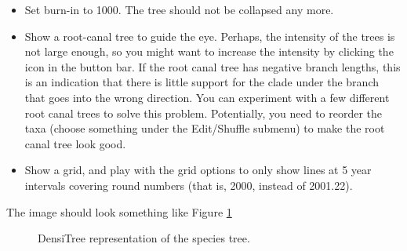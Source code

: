 \documentclass{article}
\begin{document}
\begin{itemize}
\item Set burn-in to 1000. The tree should not be collapsed any more.
\item Show a root-canal tree to guide the eye. Perhaps, the intensity of the trees is not large enough, so you might want to increase the intensity by clicking the icon in the button bar. If the root canal tree has negative branch lengths, this is an indication that there is little support for the clade under the branch that goes into the wrong direction. You can experiment with a few different root canal trees to solve this problem. Potentially, you need to reorder the taxa (choose something under the Edit/Shuffle submenu) to make the root canal tree look good.
\item Show a grid, and play with the grid options to only show lines at 5 year intervals covering round numbers (that is, 2000, instead of 2001.22).
\end{itemize}

The image should look something like Figure \ref{fig.DensiTree}

\begin{figure}
\begin{center}


\end{center}
\caption{\label{fig.DensiTree} DensiTree representation of the species tree.}
\end{figure}
\end{document}
